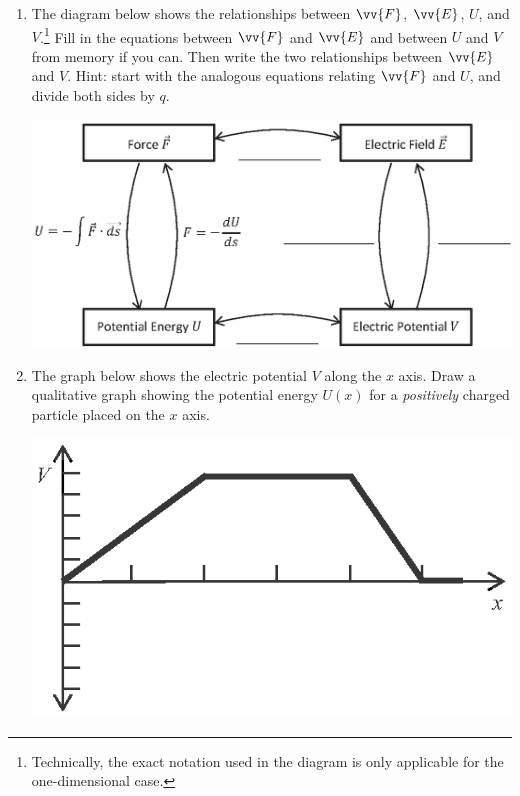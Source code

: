 \begin{enumerate}[wide, label=(\emph{\alph*})]

\item The diagram below shows the relationships between $\vv{F}$, $\vv{E}$, $U$, and $V$.\footnote{Technically, the exact notation used in the diagram is only applicable for the one-dimensional case.}
Fill in the equations between $\vv{F}$ and $\vv{E}$ and between $U$ and $V$ from memory if you can.  Then write the two relationships between $\vv{E}$ and $V$.  Hint: start with the analogous equations relating $\vv{F}$ and $U$, and divide both sides by $q$.  
\begin{center}
\includegraphics{potential_intro/concept_map_figs/concept_map_all_blanks.eps}
\vspace*{0.2in}
\end{center}

\item The graph below shows the electric potential $V$ along the $x$ axis.  Draw a qualitative graph showing the potential energy $U(x)$ for a \textit{positively} charged particle placed on the $x$ axis.  \label{part_potential_intro_given_V}
\begin{center}
\includegraphics{potential_intro/activity_5_figs/given_V.eps}


\end{center}
\end{enumerate}
